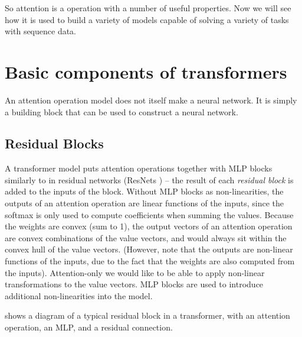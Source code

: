 So attention is a operation with a number of useful properties. Now we will see how it is used to build a variety of models capable of solving a variety of tasks with sequence data.

\section{Basic components of transformers}

An attention operation model does not itself make a neural network. It is simply a building block that can be used to construct a neural network.

\subsection{Residual Blocks}

A transformer model puts attention operations together with MLP blocks similarly to in residual networks (ResNets \cite{resnet}) -- the result of each \textit{residual block} is added to the inputs of the block. Without MLP blocks as non-linearities, the outputs of an attention operation are linear functions of the inputs, since the softmax is only used to compute coefficients when summing the values. Because the weights are convex (sum to 1), the output vectors of an attention operation are convex combinations of the value vectors, and would always sit within the convex hull of the value vectors. (However, note that the outputs are non-linear functions of the inputs, due to the fact that the weights are also computed from the inputs). Attention-only we would like to be able to apply non-linear transformations to the value vectors. MLP blocks are used to introduce additional non-linearities into the model.

 shows a diagram of a typical residual block in a transformer, with an attention operation, an MLP, and a residual connection.

